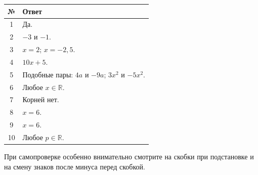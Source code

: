 \documentclass[a4paper,12pt]{article}
\newcommand{\R}{\mathbb{R}}
\begin{document}
\renewcommand{\arraystretch}{1.45}
\begin{center}
\begin{tabularx}{0.94\linewidth}{@{}c X@{}}
\toprule
\textbf{№} & \textbf{Ответ} \\
\midrule
1 & Да. \\
2 & $-3$ и $-1$. \\
3 & $x=2$; $x=-2{,}5$. \\
4 & $10x+5$. \\
5 & Подобные пары: $4a$ и $-9a$; $3x^2$ и $-5x^2$. \\
6 & Любое $x\in\R$. \\
7 & Корней нет. \\
8 & $x=6$. \\
9 & $x=6$. \\
10 & Любое $p\in\R$. \\
\bottomrule
\end{tabularx}
\end{center}

\vfill
{\small\color{textgray}При самопроверке особенно внимательно смотрите на скобки при подстановке и на смену знаков после минуса перед скобкой.}
\end{document}

